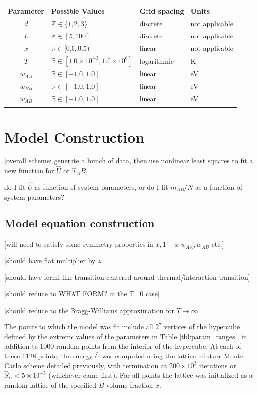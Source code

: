 \documentclass[10pt]{article}
\begin{document}
\begin{center}
\begin{tabular}{c | l | l | l} 
    \hline
    Parameter & Possible Values & Grid spacing & Units \\  \hline
    $d$ & $\mathbb{Z} \in \{1,2,3\}$ & discrete & not applicable \\ \hline
    $L$ & $\mathbb{Z} \in [5,100]$ & discrete & not applicable \\ \hline
    $x$ & $\mathbb{R} \in [0.0,0.5)$ & linear & not applicable \\ \hline
    $T$ & $\mathbb{R} \in [1.0 \times 10^{-3},1.0 \times 10^6]$ & logarithmic & K \\ \hline
    $w_{AA}$ & $\mathbb{R} \in [-1.0, 1.0]$ & linear & eV \\ \hline
    $w_{BB}$ & $\mathbb{R} \in [-1.0, 1.0]$ & linear & eV \\ \hline
    $w_{AB}$ & $\mathbb{R} \in [-1.0, 1.0]$ & linear & eV \\
    \label{tbl:param_ranges}
\end{tabular}
\end{center}



\section{Model Construction}
[overall scheme: generate a bunch of data, then use nonlinear least squares to fit a new function for $\hat{U}$ or $\hat{w}_AB$]

do I fit $\hat{U}$ as function of system parameters, or do I fit $m_{AB}/N$ as a function of system parameters?

\subsection{Model equation construction}
[will need to satisfy some symmetry properties in $x, 1-x$ $w_{AA},w_{AB}$ etc.]

[should have flat multiplier by $z$]

[should have fermi-like transition centered around thermal/interaction transition]

[should reduce to WHAT FORM? in the T=0 case]

[should reduce to the Bragg-Williams approximation for $T \rightarrow \infty$]

The points to which the model was fit include all $2^7$ vertices of the hypercube defined by the extreme values of the parameters in Table \ref{tbl:param_ranges}, in addition to 1000 random points from the interior of the hypercube.
At each of these 1128 points, the energy $\bar{U}$ was computed using the lattice mixture Monte Carlo scheme detailed previously, with termination at $200 \times 10^3$ iterations or $\hat{S}_{\bar{U}} < 5 \times 10^{-5}$ (whichever came first).
For all points the lattice was initialized as a random lattice of the specified $B$ volume fraction $x$.
\end{document}
